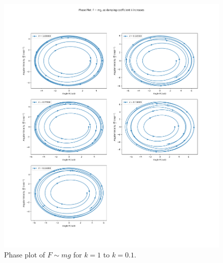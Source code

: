 \documentclass[10pt, twocolumn]{article}
\begin{document}
\begin{figure}
    \centering
    \includegraphics[width = \columnwidth]{Projects/ForcedSimplePendulum/Plots/Phase plot of F~mg as damping coefficient k increases from 1 to 0.1.png}
    \caption{Phase plot of $F \sim{mg}$ for $k = 1$ to $k = 0.1$.}
    \label{Phase plot of k 1 to 0.1}
\end{figure}
\end{document}

